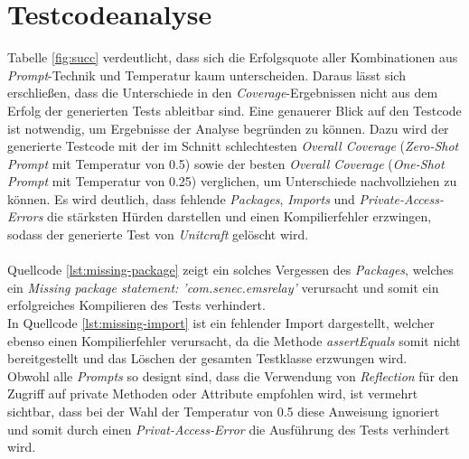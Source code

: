 \section{Testcodeanalyse}\label{sec:testanaly}
Tabelle \ref{fig:succ} verdeutlicht, dass sich die Erfolgsquote aller Kombinationen aus \textit{Prompt}-Technik und Temperatur kaum unterscheiden. Daraus lässt sich erschließen, dass die Unterschiede in den \textit{Coverage}-Ergebnissen nicht aus dem Erfolg der generierten Tests ableitbar sind. Eine genauerer Blick auf den Testcode ist notwendig, um Ergebnisse der Analyse begründen zu können. Dazu wird der generierte Testcode mit der im Schnitt schlechtesten \textit{Overall Coverage}  (\textit{Zero-Shot Prompt} mit Temperatur von 0.5) sowie der besten \textit{Overall Coverage}  (\textit{One-Shot Prompt} mit Temperatur von 0.25) verglichen, um Unterschiede nachvollziehen zu können. Es wird deutlich, dass fehlende \textit{Packages}, \textit{Imports} und \textit{Private-Access-Errors} die stärksten Hürden darstellen und einen Kompilierfehler erzwingen, sodass der generierte Test von \textit{Unitcraft} gelöscht wird. \\\\
Quellcode \ref{lst:missing-package} zeigt ein solches Vergessen des \textit{Packages}, welches ein \textit{Missing package statement: 'com.senec.emsrelay'} verursacht und somit ein erfolgreiches Kompilieren des Tests verhindert.\\

In Quellcode \ref{lst:missing-import} ist ein fehlender Import dargestellt, welcher ebenso einen Kompilierfehler verursacht, da die Methode \textit{assertEquals} somit nicht bereitgestellt und das Löschen der gesamten Testklasse erzwungen wird.\\

Obwohl alle \textit{Prompts} so designt sind, dass die Verwendung von \textit{Reflection} für den Zugriff auf private Methoden oder Attribute empfohlen wird, ist vermehrt sichtbar, dass bei der Wahl der Temperatur von 0.5 diese Anweisung ignoriert und somit durch einen \textit{Privat-Access-Error} die Ausführung des Tests verhindert wird.\\

